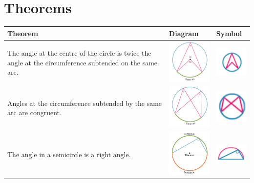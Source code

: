 \documentclass{book}
\begin{document}
\section{Theorems}
\begin{center}
	\begin{tabular}[center]{|p{5cm}|p{3cm}|p{2cm}|}
		\hline
		Theorem                                                                                                              & Diagram                                       & Symbol                                               \\ \hline
		The angle at the centre of the circle is twice the angle at the circumference subtended on the same arc.             & \includegraphics[width=3cm]{circle theorem 1} & \includegraphics[width=2cm]{circle theorem 1 symbol} \\ \hline
		Angles at the circumference subtended by the same arc are congruent.                                                 & \includegraphics[width=3cm]{circle theorem 2} & \includegraphics[width=2cm]{circle theorem 2 symbol} \\ \hline
		The angle in a semicircle is a right angle.                                                                          & \includegraphics[width=3cm]{circle theorem 3} & \includegraphics[width=2cm]{circle theorem 3 symbol} \\ \hline

\end{tabular}
\end{center}
\end{document}
